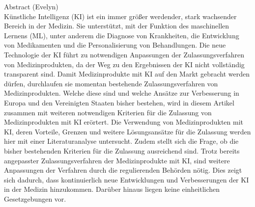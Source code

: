 {\centering
{\large Abstract (Evelyn)\\}
}
Künstliche Intelligenz (KI) ist ein immer größer werdender, 
stark wachsender Bereich in der Medizin.
Sie unterstützt, mit der Funktion des maschinellen Lernens (ML), unter anderem die Diagnose von Krankheiten,
die Entwicklung von Medikamenten und die Personalisierung von Behandlungen. 
Die neue Technologie der KI führt zu notwendigen Anpassungen der Zulassungsverfahren von Medizinprodukten,
da der Weg zu den Ergebnissen der KI nicht vollständig transparent sind.
Damit Medizinprodukte mit KI auf den Markt gebracht werden dürfen,
durchlaufen sie momentan bestehende Zulassungsverfahren von Medizinprodukten.
Welche diese sind und welche Ansätze zur Verbesserung in Europa und den Vereinigten Staaten bisher bestehen, 
wird in diesem Artikel zusammen mit weiteren notwendigen Kriterien für die Zulassung von Medizinprodukten mit KI erörtert. 
Die Verwendung von Medizinprodukten mit KI, 
deren Vorteile, Grenzen und weitere Lösungsansätze für die Zulassung werden hier mit einer Literaturanalyse untersucht.
Zudem stellt sich die Frage, 
ob die bisher bestehenden Kriterien für die Zulassung ausreichend sind. 
Trotz bereits angepasster Zulassungsverfahren der Medizinprodukte mit KI, sind weitere Anpassungen der Verfahren durch die regulierenden Behörden nötig.
Dies zeigt sich dadurch, dass kontinuierlich neue Entwicklungen und Verbesserungen der KI in der Medizin hinzukommen. Darüber hinaus liegen keine einheitlichen Gesetzgebungen vor.

